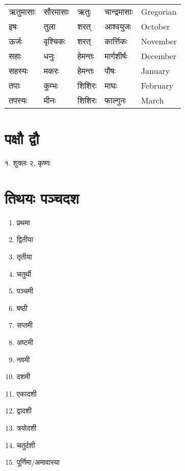 \begin{tabular}{lllll}
ऋतुमासाः & सौरमासाः & ऋतुः     & चान्द्रमासाः & \textsf{\normalsize Gregorian}\\
इषः      & तुला     & शरत्     & आश्वयुजः     & \textsf{\normalsize October}\\
ऊर्जः    & वृश्चिकः & शरत्     & कार्त्तिकः   & \textsf{\normalsize November}\\
सहाः     & धनुः     & हेमन्तः  & मार्गशीर्षः  & \textsf{\normalsize December}\\
सहस्यः   & मकरः     & हेमन्तः  & पौषः         & \textsf{\normalsize January}\\
तपाः     & कुम्भः   & शिशिरः   & माघः         & \textsf{\normalsize February}\\
तपस्यः   & मीनः     & शिशिरः   & फाल्गुनः     & \textsf{\normalsize March}\\
\end{tabular}

\section*{पक्षौ द्वौ}

१. शुक्लः \hspace{2em} २. कृष्णः 

\section*{तिथयः पञ्चदश}

\begin{multicols}{2}
\begin{enumerate}\itemsep-0.8ex
\item प्रथमा 
\item द्वितीया 
\item तृतीया 
\item चतुर्थी 
\item पञ्चमी 
\item षष्ठी 
\item सप्तमी 
\item अष्टमी 
\item नवमी 
\item दशमी 
\item एकादशी 
\item द्वादशी 
\item त्रयोदशी 
\item चतुर्दशी 
\item पूर्णिमा/अमावास्या 
\end{enumerate}
\end{multicols}

